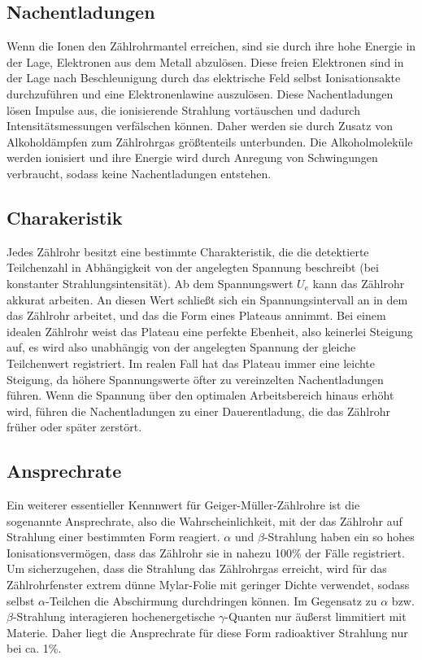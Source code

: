 \documentclass{scrartcl}
\begin{document}
\subsection{Nachentladungen}
Wenn die Ionen den Zählrohrmantel erreichen, sind sie durch ihre hohe Energie in der Lage, Elektronen aus dem Metall abzulösen. Diese freien Elektronen sind in der Lage nach Beschleunigung durch das elektrische Feld selbst Ionisationsakte durchzuführen und eine Elektronenlawine auszulösen. Diese Nachentladungen lösen Impulse aus, die ionisierende Strahlung vortäuschen und dadurch Intensitätsmessungen verfälschen können. Daher werden sie durch Zusatz von Alkoholdämpfen zum Zählrohrgas größtenteils unterbunden. Die Alkoholmoleküle werden ionisiert und ihre Energie wird durch Anregung von Schwingungen verbraucht, sodass keine Nachentladungen entstehen.
\subsection{Charakeristik}
Jedes Zählrohr besitzt eine bestimmte Charakteristik, die die detektierte Teilchenzahl in Abhängigkeit von der angelegten Spannung beschreibt (bei konstanter Strahlungsintensität). Ab dem Spannungswert $U_e$ kann das Zählrohr akkurat arbeiten. An diesen Wert schließt sich ein Spannungsintervall an in dem das Zählrohr arbeitet, und das die Form eines Plateaus annimmt. Bei einem idealen Zählrohr weist das Plateau eine perfekte Ebenheit, also keinerlei Steigung auf, es wird also unabhängig von der angelegten Spannung der gleiche Teilchenwert registriert. Im realen Fall hat das Plateau immer eine leichte Steigung, da höhere Spannungswerte öfter zu vereinzelten Nachentladungen führen. Wenn die Spannung über den optimalen Arbeitsbereich hinaus erhöht wird, führen die Nachentladungen zu einer Dauerentladung, die das Zählrohr früher oder später zerstört.
\subsection{Ansprechrate}
Ein weiterer essentieller Kennnwert für Geiger-Müller-Zählrohre ist die sogenannte Ansprechrate, also die Wahrscheinlichkeit, mit der das Zählrohr auf Strahlung einer bestimmten Form reagiert. $\alpha$ und $\beta$-Strahlung haben ein so hohes Ionisationsvermögen, dass das Zählrohr sie in nahezu 100\% der Fälle registriert. Um sicherzugehen, dass die Strahlung das Zählrohrgas erreicht, wird für das Zählrohrfenster extrem dünne Mylar-Folie mit geringer Dichte verwendet, sodass selbst $\alpha$-Teilchen die Abschirmung durchdringen können. Im Gegensatz zu $\alpha$ bzw. $\beta$-Strahlung interagieren hochenergetische $\gamma$-Quanten nur äußerst limmitiert mit Materie. Daher liegt die Ansprechrate für diese Form radioaktiver Strahlung nur bei ca. 1\%.
\end{document}
